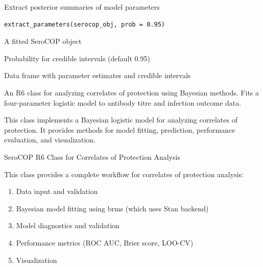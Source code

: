 \documentclass[a4paper]{book}
\begin{document}
%
\begin{Description}
Extract posterior summaries of model parameters
\end{Description}
%
\begin{Usage}
\begin{verbatim}
extract_parameters(serocop_obj, prob = 0.95)
\end{verbatim}
\end{Usage}
%
\begin{Arguments}
\begin{ldescription}
\item[\code{serocop\_obj}] A fitted SeroCOP object

\item[\code{prob}] Probability for credible intervals (default 0.95)
\end{ldescription}
\end{Arguments}
%
\begin{Value}
Data frame with parameter estimates and credible intervals
\end{Value}
%
\begin{Description}
An R6 class for analyzing correlates of protection using Bayesian methods.
Fits a four-parameter logistic model to antibody titre and infection outcome data.

This class implements a Bayesian logistic model for analyzing correlates of protection.
It provides methods for model fitting, prediction, performance evaluation, and visualization.
\end{Description}
%
\begin{Details}
SeroCOP R6 Class for Correlates of Protection Analysis

This class provides a complete workflow for correlates of protection analysis:
\begin{enumerate}

\item{} Data input and validation
\item{} Bayesian model fitting using brms (which uses Stan backend)
\item{} Model diagnostics and validation
\item{} Performance metrics (ROC AUC, Brier score, LOO-CV)
\item{} Visualization

\end{enumerate}

\end{Details}
\end{document}

